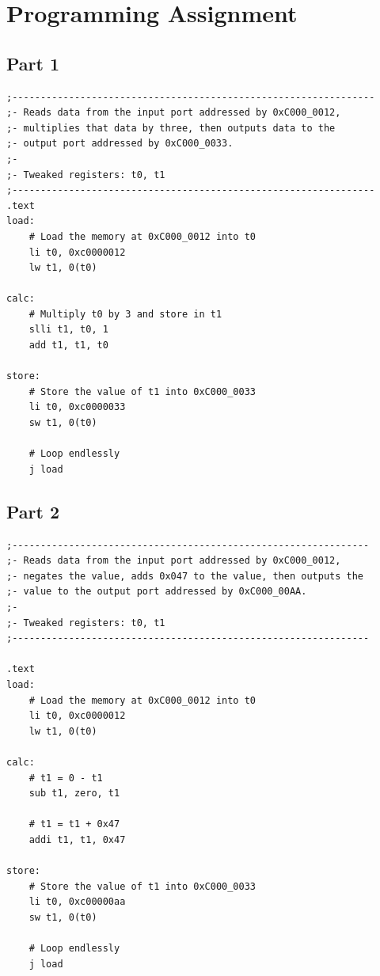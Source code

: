 \documentclass{article}
\begin{document}
\section{Programming Assignment}

\subsection{Part 1}

\begin{verbatim}
;----------------------------------------------------------------
;- Reads data from the input port addressed by 0xC000_0012, 
;- multiplies that data by three, then outputs data to the 
;- output port addressed by 0xC000_0033.
;-
;- Tweaked registers: t0, t1
;----------------------------------------------------------------
.text
load:
	# Load the memory at 0xC000_0012 into t0
	li t0, 0xc0000012
	lw t1, 0(t0)

calc:
    # Multiply t0 by 3 and store in t1
    slli t1, t0, 1  
    add t1, t1, t0 

store:
    # Store the value of t1 into 0xC000_0033
    li t0, 0xc0000033
    sw t1, 0(t0)

    # Loop endlessly
    j load
\end{verbatim}

\subsection{Part 2}
\begin{verbatim}
;---------------------------------------------------------------
;- Reads data from the input port addressed by 0xC000_0012, 
;- negates the value, adds 0x047 to the value, then outputs the 
;- value to the output port addressed by 0xC000_00AA. 
;-
;- Tweaked registers: t0, t1
;---------------------------------------------------------------
    
.text
load:
	# Load the memory at 0xC000_0012 into t0
	li t0, 0xc0000012
	lw t1, 0(t0)

calc:
    # t1 = 0 - t1
    sub t1, zero, t1
    
  	# t1 = t1 + 0x47
    addi t1, t1, 0x47

store:
    # Store the value of t1 into 0xC000_0033
    li t0, 0xc00000aa
    sw t1, 0(t0)

    # Loop endlessly
    j load
\end{verbatim}
\end{document}
